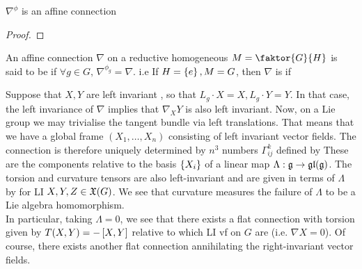 \documentclass{article}
\begin{document}
\begin{lemma}
$\nabla^\phi$ is an affine connection
\end{lemma}
\begin{proof}
\end{proof}

\begin{definition}
An affine connection $\nabla$ on a reductive homogeneous $M=\faktor{G}{H}$ is said to be  if $\forall g \in G, \, \nabla^{\phi_g} = \nabla$. i.e 
If $H = \pbrace{e}, M=G$, then $\nabla$ is  if 
\end{definition}

Suppose that $X,Y$ are left invariant , so that $L_g \cdot X = X, L_g \cdot Y = Y$. In that case, the left invariance of $\nabla$ implies that $\nabla_XY$ is also left invariant. Now, on a Lie group we may trivialise the tangent bundle via left translations. That means that we have a global frame $(X_1, \dots, X_n)$ consisting of left invariant vector fields. The connection is therefore uniquely determined by $n^3$ numbers $\Gamma^k_{ij}$ defined by 
These are the components relative to the basis $\pbrace{X_i}$ of a linear map $\Lambda : \mf{g} \to \mf{gl}(\mf{g})$. The torsion and curvature tensors are also left-invariant and are given in terms of $\Lambda$ by 
for LI $X,Y,Z \in \mf{X}(G)$. We see that curvature measures the failure of $\Lambda$ to be a Lie algebra homomorphism. \\
In particular, taking $\Lambda = 0$, we see that there exists a flat connection with torsion given by $T(X,Y) = -\comm[X]{Y}$ relative to which LI vf on $G$ are  (i.e. $\nabla X = 0$). Of course, there exists another flat connection annihilating the right-invariant vector fields. 
\end{document}
